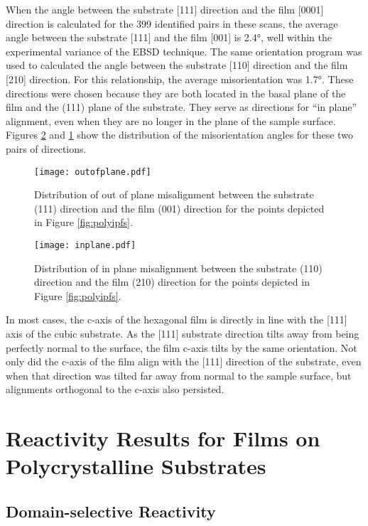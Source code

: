 When the angle between the substrate [111] direction and the film [0001] direction is calculated for the 399 identified pairs in these scans, the average angle between the substrate [111] and the film [001] is 2.4\si{\degree}, well within the experimental variance of the EBSD technique. The same orientation program was used to calculated the angle between the substrate [110] direction and the film [210] direction. For this relationship, the average misorientation was 1.7\si{\degree}. These directions were chosen because they are both located in the basal plane of the film and the (111) plane of the substrate. They serve as directions for ``in plane'' alignment, even when they are no longer in the plane of the sample surface. Figures \ref{fig:inplane} and \ref{fig:outofplane} show the distribution of the misorientation angles for these two pairs of directions. 
\begin{figure}
	\texttt{[image: outofplane.pdf]}
		\caption[Distribution of out of plane misalignment]{%
			Distribution of out of plane misalignment between the 
			substrate (111) direction and the film (001) direction 
			for the points depicted in Figure \ref{fig:polyipfs}.}
	\label{fig:outofplane}
\end{figure} 
\begin{figure}
	\texttt{[image: inplane.pdf]}
		\caption[Distribution of in plane misalignment]{%
			Distribution of in plane misalignment between the 
			substrate (110) direction and the film (210) direction 
			for the points depicted in Figure \ref{fig:polyipfs}.}
	\label{fig:inplane}
\end{figure}
In most cases, the c-axis of the hexagonal film is directly in line with the [111] axis of the cubic substrate. As the [111] substrate direction tilts away from being perfectly normal to the surface, the film c-axis tilts by the same orientation. Not only did the c-axis of the film align with the [111] direction of the substrate, even when that direction was tilted far away from normal to the sample surface, but alignments orthogonal to the c-axis also persisted.  


\section{Reactivity Results for Films on Polycrystalline Substrates}\label{sec:ch6reactivity}


\subsection{Domain-selective Reactivity}
\label{subsec:ch6domain}



